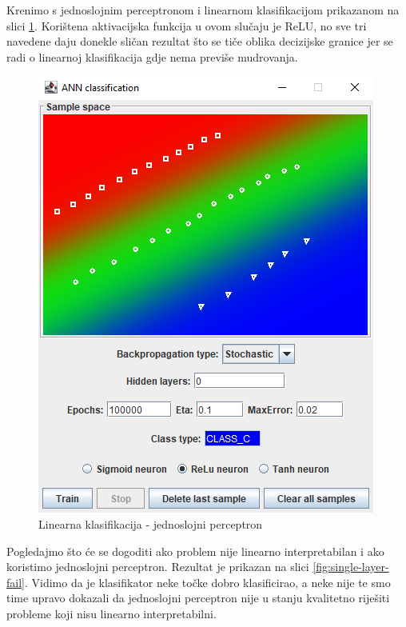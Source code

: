 \documentclass[times, utf8, zavrsni]{fer}
\begin{document}
Krenimo s jednoslojnim perceptronom i linearnom klasifikacijom prikazanom na slici \ref{fig:single-layer-class}. Korištena aktivacijska funkcija u ovom slučaju je ReLU, no sve tri navedene daju donekle sličan rezultat što se tiče oblika decizijske granice jer se radi o linearnoj klasifikacija gdje nema previše mudrovanja.

\begin{figure}[H]
    \centering
    \includegraphics[scale=0.6]{img/single-layer.png}
    \caption[Caption for LOF]{Linearna klasifikacija - jednoslojni perceptron}
    \label{fig:single-layer-class}
\end{figure}

Pogledajmo što će se dogoditi ako problem nije linearno interpretabilan i ako koristimo jednoslojni perceptron. Rezultat je prikazan na slici \ref{fig:single-layer-fail}. Vidimo da je klasifikator neke točke dobro klasificirao, a neke nije te smo time upravo dokazali da jednoslojni perceptron nije u stanju kvalitetno riješiti probleme koji nisu linearno interpretabilni.
\end{document}
